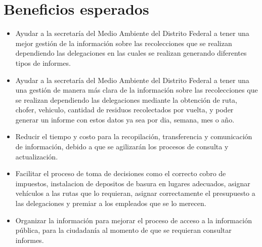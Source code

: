 \section{Beneficios esperados}
\begin{itemize}
	\item Ayudar a la secretaría del Medio Ambiente del Distrito Federal a tener una mejor gestión de la información sobre las recolecciones que se realizan dependiendo las delegaciones en las cuales se realizan generando diferentes tipos de informes.
	
	\item Ayudar a la secretaría del Medio Ambiente del Distrito Federal a tener una una gestión de manera más clara de la información sobre las recolecciones que se realizan dependiendo las delegaciones mediante la obtención de ruta, chofer, vehiculo, cantidad de residuos recolectados por vuelta, y poder generar un informe con estos datos ya sea por dia, semana, mes o año.
	
	\item Reducir el tiempo y costo para la recopilación, transferencia y comunicación de información, debido a que se agilizarán los procesos de consulta y actualización.
	
	\item Facilitar el proceso de toma de decisiones como el correcto cobro de impuestos, instalacion de depositos de basura en lugares adecuados, asignar vehículos a las rutas que lo requieran, asignar correctamente el presupuesto a las delegaciones y premiar a los empleados que se lo merecen.
	
	\item Organizar la información para mejorar el proceso de acceso a la información pública, para la ciudadanía al momento de que se requieran consultar informes.
	
\end{itemize}
